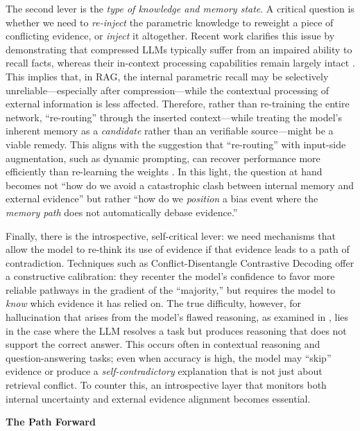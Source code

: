 \documentclass[11pt]{article}
\begin{document}
The second lever is the \emph{type of knowledge and memory state}. A critical question is whether we need to \emph{re-inject} the parametric knowledge to reweight a piece of conflicting evidence, or \emph{inject} it altogether. Recent work clarifies this issue by demonstrating that compressed LLMs typically suffer from an impaired ability to recall facts, whereas their in-context processing capabilities remain largely intact \cite{ref439}. This implies that, in RAG, the internal parametric recall may be selectively unreliable---especially after compression---while the contextual processing of external information is less affected. Therefore, rather than re-training the entire network, ``re-routing'' through the inserted context---while treating the model's inherent memory as a \emph{candidate} rather than an verifiable source---might be a viable remedy. This aligns with the suggestion that ``re-routing'' with input-side augmentation, such as dynamic prompting, can recover performance more efficiently than re-learning the weights \cite{ref440}. In this light, the question at hand becomes not ``how do we avoid a catastrophic clash between internal memory and external evidence'' but rather ``how do we \emph{position} a bias event where the \emph{memory path} does not automatically debase evidence.''

Finally, there is the introspective, self-critical lever: we need mechanisms that allow the model to re-think its use of evidence if that evidence leads to a path of contradiction. Techniques such as Conflict-Disentangle Contrastive Decoding \cite{ref253} offer a constructive calibration: they recenter the model's confidence to favor more reliable pathways in the gradient of the ``majority,'' but requires the model to \emph{know} which evidence it has relied on. The true difficulty, however, for hallucination that arises from the model's flawed reasoning, as examined in \cite{ref189}, lies in the case where the LLM resolves a task but produces reasoning that does not support the correct answer. This occurs often in contextual reasoning and question-answering tasks; even when accuracy is high, the model may ``skip'' evidence or produce a \emph{self-contradictory} explanation that is not just about retrieval conflict. To counter this, an introspective layer that monitors both internal uncertainty and external evidence alignment becomes essential.

\textbf{The Path Forward}
\end{document}
